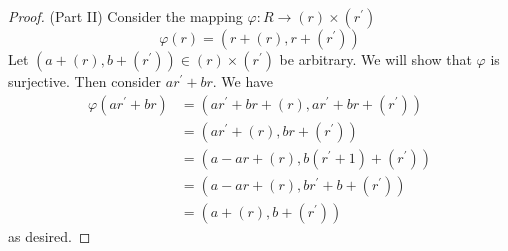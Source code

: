 \documentclass{article}
\begin{document}
\begin{enumerate}
\begin{proof}
                (Part II) Consider the mapping $\varphi : R \rightarrow (r) \times (r^{\prime})$
                \begin{equation*}
                    \varphi(r) = (r + (r), r + (r^{\prime}))
                \end{equation*}
                Let $(a + (r), b + (r^{\prime})) \in (r) \times (r^{\prime})$ be arbitrary. We will show that $\varphi$ is surjective. Then consider $ar^{\prime} + br$. We have
                \begin{align*}
                    \varphi(ar^{\prime} + br) &= (ar^{\prime} + br + (r), ar^{\prime} + br + (r^{\prime})) \\
                                              &= (ar^{\prime} + (r), br + (r^{\prime})) \\
                                              &= (a - ar + (r), b(r^{\prime} + 1) + (r^{\prime})) \\
                                              &= (a - ar + (r), br^{\prime} + b + (r^{\prime})) \\
                                              &= (a + (r), b + (r^{\prime}))
                \end{align*} 
                as desired.
            \end{proof}
    \end{enumerate}
\end{document}
